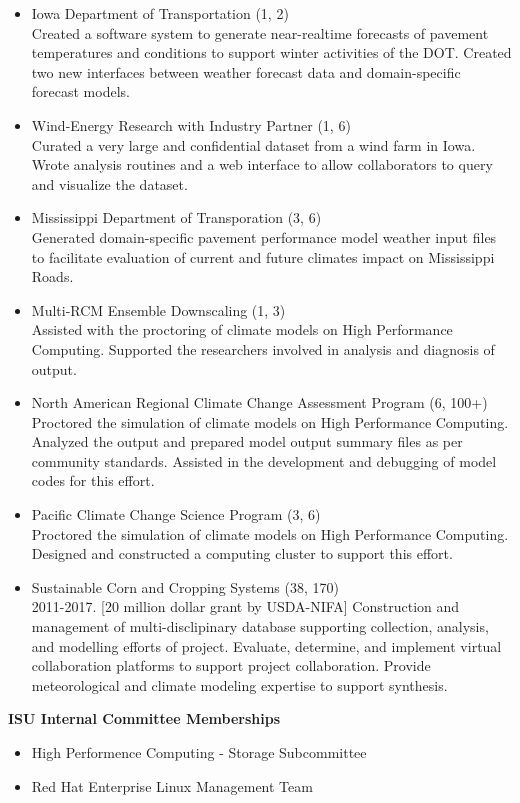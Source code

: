 \begin{itemize}
\item Iowa Department of Transportation (1, 2)\\
Created a software system to generate near-realtime forecasts of pavement
temperatures and conditions to support winter activities of the DOT.  Created
two new interfaces between weather forecast data and domain-specific forecast
models.
\item Wind-Energy Research with Industry Partner (1, 6)\\
Curated a very large and confidential dataset from a wind farm in Iowa. Wrote
analysis routines and a web interface to allow collaborators to query and
visualize the dataset.
\item Mississippi Department of Transporation (3, 6)\\
Generated domain-specific pavement performance model weather input files
to facilitate evaluation of current and future climates impact on 
Mississippi Roads.
\item Multi-RCM Ensemble Downscaling (1, 3)\\
Assisted with the proctoring of climate models on High Performance Computing.
Supported the researchers involved in analysis and diagnosis of output.
\item North American Regional Climate Change Assessment Program (6, 100+)\\
Proctored the simulation of climate models on High Performance Computing.
 Analyzed the output and prepared model output summary files as per 
community standards.  Assisted in the development and debugging of model
codes for this effort.
\item Pacific Climate Change Science Program (3, 6)\\
Proctored the simulation of climate models on High Performance Computing.
Designed and constructed a computing cluster to support this effort.
\item Sustainable Corn and Cropping Systems (38, 170)\\
2011-2017. [20 million dollar grant by USDA-NIFA] Construction and management of multi-disclipinary database supporting collection, analysis, and modelling efforts of project. 
Evaluate, determine, and implement virtual collaboration platforms to 
support project collaboration.  Provide meteorological and climate modeling
expertise to support synthesis.
\end{itemize}
%
\Large \bf ISU Internal Committee Memberships
\normalsize \sf
\begin{itemize}
\item High Performence Computing - Storage Subcommittee
\item Red Hat Enterprise Linux Management Team
\end{itemize}
